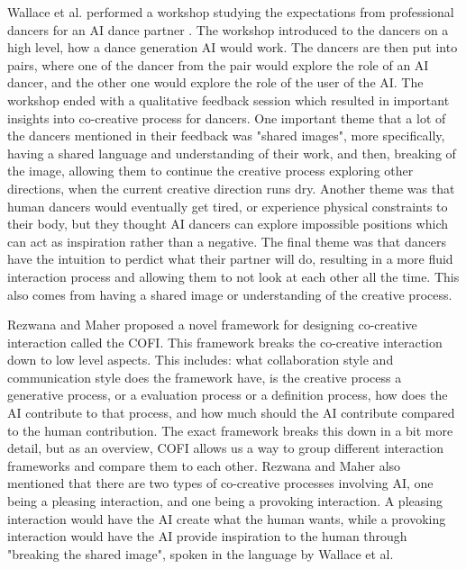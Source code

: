 \documentclass[final,5p,times,twocolumn,authoryear]{article}
\begin{document}
Wallace et al. performed a workshop studying the expectations from
professional dancers for an AI dance partner \cite{Wallace2023}. The workshop introduced to
the dancers on a high level, how a dance generation AI would work. The
dancers are then put into pairs, where one of the dancer from the pair
would explore the role of an AI dancer, and the other one would explore
the role of the user of the AI. The workshop ended with a qualitative
feedback session which resulted in important insights into co-creative
process for dancers. One important theme that a lot of the dancers
mentioned in their feedback was "shared images", more specifically,
having a shared language and understanding of their work, and then,
breaking of the image, allowing them to continue the creative process
exploring other directions, when the current creative direction runs
dry. Another theme was that human dancers would eventually get tired, or
experience physical constraints to their body, but they thought AI
dancers can explore impossible positions which can act as inspiration
rather than a negative. The final theme was that dancers have the
intuition to perdict what their partner will do, resulting in a more
fluid interaction process and allowing them to not look at each other
all the time. This also comes from having a shared image or
understanding of the creative process.

Rezwana and Maher proposed a novel framework for designing co-creative
interaction called the COFI. This framework breaks the co-creative
interaction down to low level aspects. This includes: what collaboration style
and communication style does the framework have, is the creative process
a generative process, or a evaluation process or a definition process, how does the AI
contribute to that process, and how much should the AI contribute
compared to the human contribution. The exact framework breaks this down
in a bit more detail, but as an overview, COFI allows us a way to group
different interaction frameworks and compare them to each other. Rezwana
and Maher also mentioned that there are two types of co-creative
processes involving AI, one being a pleasing interaction, and one being
a provoking interaction. A pleasing interaction would have the AI create
what the human wants, while a provoking interaction would have the AI
provide inspiration to the human through "breaking the shared image",
spoken in the language by Wallace et al.
\end{document}
